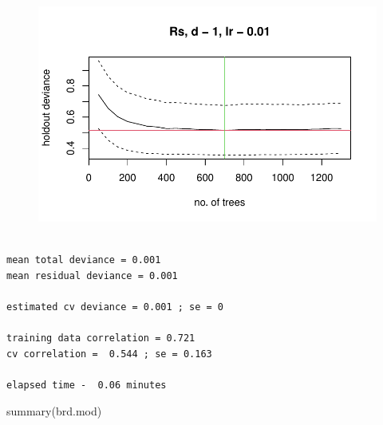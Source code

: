 \documentclass[
  letterpaper,
  DIV=11,
  numbers=noendperiod]{scrartcl}
\newenvironment{Shaded}{\begin{snugshade}}{\end{snugshade}}
\newcommand{\FunctionTok}[1]{\textcolor[rgb]{0.28,0.35,0.67}{#1}}
\newcommand{\NormalTok}[1]{\textcolor[rgb]{0.00,0.23,0.31}{#1}}
\begin{document}
\begin{figure}[H]

{\centering \includegraphics{Preliminary-Results_files/figure-pdf/Boosted Regression Trees-1.pdf}

}

\end{figure}

\begin{verbatim}

mean total deviance = 0.001 
mean residual deviance = 0.001 
 
estimated cv deviance = 0.001 ; se = 0 
 
training data correlation = 0.721 
cv correlation =  0.544 ; se = 0.163 
 
elapsed time -  0.06 minutes 
\end{verbatim}

\begin{Shaded}
\begin{Highlighting}[]
\FunctionTok{summary}\NormalTok{(brd.mod)}
\end{Highlighting}
\end{Shaded}
\end{document}
